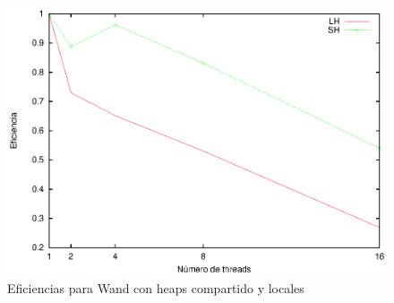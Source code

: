 \begin{figure}[!ht]
\centering
\includegraphics[scale=.75]{images/eficiencias_wand.eps}
\caption{Eficiencias para Wand con heaps compartido y locales}
\label{fig:eficiencias_wand}
\end{figure}


